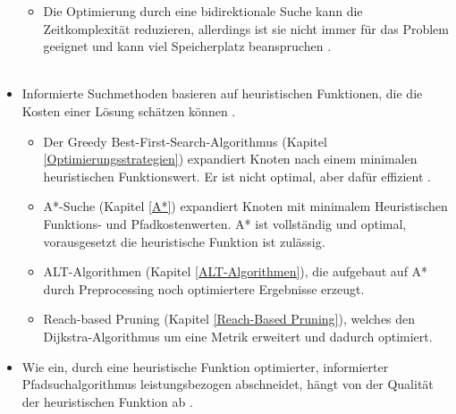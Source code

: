 \begin{itemize}
\begin{itemize}
        \item Die Optimierung durch eine bidirektionale Suche kann die Zeitkomplexität reduzieren, allerdings ist sie nicht immer für das Problem geeignet und kann viel Speicherplatz beanspruchen \cite[108,109]{Russell:10}.\\\\
    \end{itemize}
    \newpage
    \item Informierte Suchmethoden basieren auf heuristischen Funktionen, die die Kosten einer Lösung schätzen können \cite[108,109]{Russell:10}. 
    \begin{itemize}
        \item Der Greedy Best-First-Search-Algorithmus (Kapitel \ref{Optimierungsstrategien}) expandiert Knoten nach einem minimalen heuristischen Funktionswert. Er ist nicht optimal, aber dafür effizient \cite[108,109]{Russell:10}.
        \item A*-Suche (Kapitel \ref{A*}) expandiert Knoten mit minimalem Heuristischen Funktions- und Pfadkostenwerten. A* ist vollständig und optimal, vorausgesetzt die heuristische Funktion ist zulässig.
        \item ALT-Algorithmen (Kapitel \ref{ALT-Algorithmen}), die aufgebaut auf A* durch Preprocessing noch optimiertere Ergebnisse erzeugt.
        \item Reach-based Pruning (Kapitel \ref{Reach-Based Pruning}), welches den Dijkstra-Algorithmus um eine Metrik erweitert und dadurch optimiert.
    \end{itemize}
    \item Wie ein, durch eine heuristische Funktion optimierter, informierter Pfadsuchalgorithmus leistungsbezogen abschneidet, hängt von der Qualität der heuristischen Funktion ab \cite[108,109]{Russell:10}.
\end{itemize}

